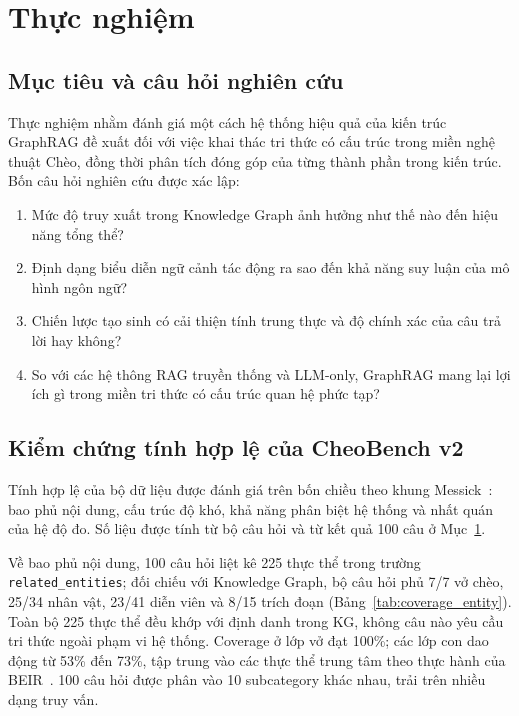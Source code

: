 
\section{Thực nghiệm}
\label{sec:experiments}

\subsection{Mục tiêu và câu hỏi nghiên cứu}

Thực nghiệm nhằm đánh giá một cách hệ thống hiệu quả của kiến trúc GraphRAG đề xuất đối với việc khai thác tri thức có cấu trúc trong miền nghệ thuật Chèo, đồng thời phân tích đóng góp của từng thành phần trong kiến trúc. Bốn câu hỏi nghiên cứu được xác lập:

\begin{enumerate}
  \item Mức độ truy xuất trong Knowledge Graph ảnh hưởng như thế nào đến hiệu năng tổng thể?
  \item Định dạng biểu diễn ngữ cảnh tác động ra sao đến khả năng suy luận của mô hình ngôn ngữ?
  \item Chiến lược tạo sinh có cải thiện tính trung thực và độ chính xác của câu trả lời hay không?
  \item So với các hệ thông RAG truyền thống và LLM-only, GraphRAG mang lại lợi ích gì trong miền tri thức có cấu trúc quan hệ phức tạp?
\end{enumerate}

\subsection{Kiểm chứng tính hợp lệ của CheoBench v2}
\label{sec:benchmark_validity}

Tính hợp lệ của bộ dữ liệu được đánh giá trên bốn chiều theo khung Messick~\cite{messick1995validity}: bao phủ nội dung, cấu trúc độ khó, khả năng phân biệt hệ thống và nhất quán của hệ độ đo. Số liệu được tính từ bộ câu hỏi và từ kết quả 100 câu ở Mục~\ref{sec:experiments}.

Về bao phủ nội dung, 100 câu hỏi liệt kê 225 thực thể trong trường \\ \texttt{related\_entities}; đối chiếu với Knowledge Graph, bộ câu hỏi phủ 7/7 vở chèo, 25/34 nhân vật, 23/41 diễn viên và 8/15 trích đoạn (Bảng~\ref{tab:coverage_entity}). Toàn bộ 225 thực thể đều khớp với định danh trong KG, không câu nào yêu cầu tri thức ngoài phạm vi hệ thống. Coverage ở lớp vở đạt 100\%; các lớp con dao động từ 53\% đến 73\%, tập trung vào các thực thể trung tâm theo thực hành của BEIR~\cite{thakur2021beir}. 100 câu hỏi được phân vào 10 subcategory khác nhau, trải trên nhiều dạng truy vấn.

